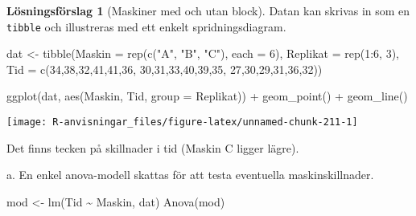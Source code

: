 \documentclass[
]{book}
\newenvironment{Shaded}{\begin{snugshade}}{\end{snugshade}}
\newcommand{\AttributeTok}[1]{\textcolor[rgb]{0.77,0.63,0.00}{#1}}
\newcommand{\DecValTok}[1]{\textcolor[rgb]{0.00,0.00,0.81}{#1}}
\newcommand{\FunctionTok}[1]{\textcolor[rgb]{0.00,0.00,0.00}{#1}}
\newcommand{\NormalTok}[1]{#1}
\newcommand{\OtherTok}[1]{\textcolor[rgb]{0.56,0.35,0.01}{#1}}
\newcommand{\SpecialCharTok}[1]{\textcolor[rgb]{0.00,0.00,0.00}{#1}}
\newcommand{\StringTok}[1]{\textcolor[rgb]{0.31,0.60,0.02}{#1}}
\theoremstyle{definition}
\theoremstyle{definition}
\theoremstyle{definition}
\theoremstyle{definition}
\newtheorem{hypothesis}{Lösningsförslag}[chapter]
\theoremstyle{remark}
\begin{document}
\begin{hypothesis}[Maskiner med och utan block]
Datan kan skrivas in som en \texttt{tibble} och illustreras med ett enkelt spridningsdiagram.

\begin{Shaded}
\begin{Highlighting}[]
\NormalTok{dat }\OtherTok{\textless{}{-}} \FunctionTok{tibble}\NormalTok{(}\AttributeTok{Maskin =} \FunctionTok{rep}\NormalTok{(}\FunctionTok{c}\NormalTok{(}\StringTok{"A"}\NormalTok{, }\StringTok{"B"}\NormalTok{, }\StringTok{"C"}\NormalTok{), }\AttributeTok{each =} \DecValTok{6}\NormalTok{),}
              \AttributeTok{Replikat =} \FunctionTok{rep}\NormalTok{(}\DecValTok{1}\SpecialCharTok{:}\DecValTok{6}\NormalTok{, }\DecValTok{3}\NormalTok{),}
              \AttributeTok{Tid =} \FunctionTok{c}\NormalTok{(}\DecValTok{34}\NormalTok{,}\DecValTok{38}\NormalTok{,}\DecValTok{32}\NormalTok{,}\DecValTok{41}\NormalTok{,}\DecValTok{41}\NormalTok{,}\DecValTok{36}\NormalTok{,}
                      \DecValTok{30}\NormalTok{,}\DecValTok{31}\NormalTok{,}\DecValTok{33}\NormalTok{,}\DecValTok{40}\NormalTok{,}\DecValTok{39}\NormalTok{,}\DecValTok{35}\NormalTok{,}
                      \DecValTok{27}\NormalTok{,}\DecValTok{30}\NormalTok{,}\DecValTok{29}\NormalTok{,}\DecValTok{31}\NormalTok{,}\DecValTok{36}\NormalTok{,}\DecValTok{32}\NormalTok{))}

\FunctionTok{ggplot}\NormalTok{(dat, }\FunctionTok{aes}\NormalTok{(Maskin, Tid, }\AttributeTok{group =}\NormalTok{ Replikat)) }\SpecialCharTok{+}
  \FunctionTok{geom\_point}\NormalTok{() }\SpecialCharTok{+}
  \FunctionTok{geom\_line}\NormalTok{()}
\end{Highlighting}
\end{Shaded}

\begin{center}\texttt{[image: R-anvisningar\_files/figure-latex/unnamed-chunk-211-1]} \end{center}

Det finns tecken på skillnader i tid (Maskin C ligger lägre).

a. En enkel anova-modell skattas för att testa eventuella maskinskillnader.

\begin{Shaded}
\begin{Highlighting}[]
\NormalTok{mod }\OtherTok{\textless{}{-}} \FunctionTok{lm}\NormalTok{(Tid }\SpecialCharTok{\textasciitilde{}}\NormalTok{ Maskin, dat)}
\FunctionTok{Anova}\NormalTok{(mod)}
\end{Highlighting}
\end{Shaded}


\end{hypothesis}
\end{document}
